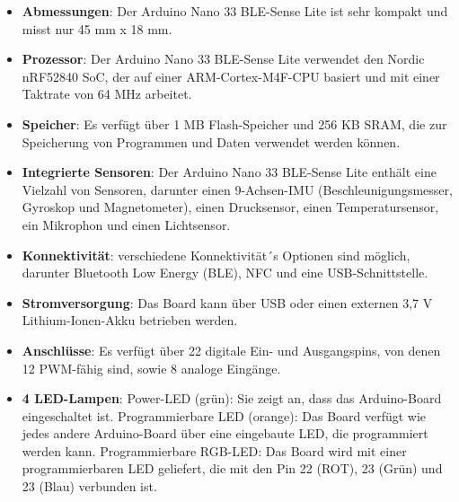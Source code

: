 \begin{itemize}
	\item \textbf{Abmessungen}: Der Arduino Nano 33 BLE-Sense Lite ist sehr kompakt und misst nur 45 mm x 18 mm.
	\item \textbf{Prozessor}: Der Arduino Nano 33 BLE-Sense Lite verwendet den Nordic nRF52840 SoC, der auf einer ARM-Cortex-M4F-CPU basiert und mit einer Taktrate von 64 MHz arbeitet.
	\item \textbf{Speicher}: Es verfügt über 1 MB Flash-Speicher und 256 KB SRAM, die zur Speicherung von Programmen und Daten verwendet werden können.
	\item \textbf{Integrierte Sensoren}: Der Arduino Nano 33 BLE-Sense Lite enthält eine Vielzahl von Sensoren, darunter einen 9-Achsen-IMU (Beschleunigungsmesser, Gyroskop und Magnetometer), einen Drucksensor, einen Temperatursensor, ein Mikrophon und einen Lichtsensor.
	\item \textbf{Konnektivität}: verschiedene Konnektivität´s Optionen sind möglich, darunter Bluetooth Low Energy (BLE), NFC und eine USB-Schnittstelle.
	\item \textbf{Stromversorgung}: Das Board kann über USB oder einen externen 3,7 V Lithium-Ionen-Akku betrieben werden.
	\item \textbf{Anschlüsse}: Es verfügt über 22 digitale Ein- und Ausgangspins, von denen 12 PWM-fähig sind, sowie 8 analoge Eingänge.
	\item  \textbf{4 LED-Lampen}: 
	\subitem Power-LED (grün): Sie zeigt an, dass das Arduino-Board eingeschaltet ist.
	\subitem Programmierbare LED (orange): Das Board verfügt wie jedes andere Arduino-Board über eine eingebaute LED, die  programmiert werden kann.
	\subitem Programmierbare RGB-LED: Das Board wird mit einer programmierbaren LED geliefert, die mit den Pin 22 (ROT), 23 (Grün) und 23 (Blau) verbunden ist.
\end{itemize}
\newpage
